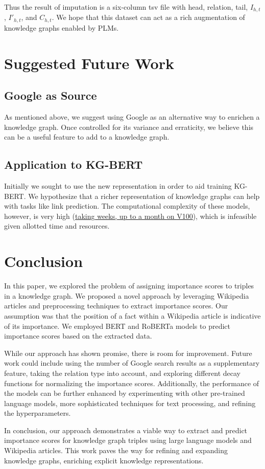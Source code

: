 \documentclass{article}
\begin{document}
Thus the result of imputation is a six-column tsv file with head, relation, tail, $I_{h,t}$, $I'_{h,t}$, and $C_{h,t}$. We hope that this dataset can act as a rich augmentation of knowledge graphs enabled by PLMs.

\section{Suggested Future Work}
\subsection{Google as Source}
As mentioned above, we suggest using Google as an alternative way to enrichen a knowledge graph. Once controlled for its variance and erraticity, we believe this can be a useful feature to add to a knowledge graph.

\subsection{Application to KG-BERT}
Initially we sought to use the new representation in order to aid training KG-BERT. We hypothesize that a richer representation of knowledge graphs can help with tasks like link prediction. The computational complexity of these models, however, is very high (\href{https://github.com/yao8839836/kg-bert/issues/8}{taking weeks, up to a month on V100}), which is infeasible given allotted time and resources.

\section{Conclusion}
In this paper, we explored the problem of assigning importance scores to triples in a knowledge graph. We proposed a novel approach by leveraging Wikipedia articles and preprocessing techniques to extract importance scores. Our assumption was that the position of a fact within a Wikipedia article is indicative of its importance. We employed BERT and RoBERTa models to predict importance scores based on the extracted data.

While our approach has shown promise, there is room for improvement. Future work could include using the number of Google search results as a supplementary feature, taking the relation type into account, and exploring different decay functions for normalizing the importance scores. Additionally, the performance of the models can be further enhanced by experimenting with other pre-trained language models, more sophisticated techniques for text processing, and refining the hyperparameters.

In conclusion, our approach demonstrates a viable way to extract and predict importance scores for knowledge graph triples using large language models and Wikipedia articles. This work paves the way for refining and expanding knowledge graphs, enriching explicit knowledge representations.



\end{document}
